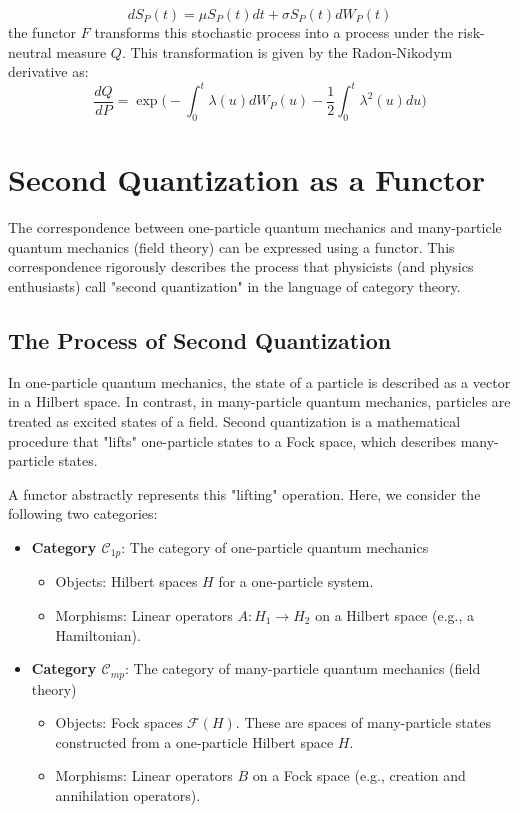 \documentclass[uplatex,a4j,12pt,dvipdfmx]{jsarticle}
\begin{document}
$$
	d S_{P} (t)
	=
	\mu S_{P} (t) dt
	+
	\sigma S_{P} (t) dW_{P}(t)
$$
the functor $F$ transforms this stochastic process into a process under the risk-neutral measure $Q$. This transformation is given by the Radon-Nikodym derivative as:
$$
	\frac{dQ}{dP}
	=
	\exp \Big(
	- \int_{0}^{t} \lambda(u) d W_{P} (u)
	- \frac{1}{2} \int^{t}_{0} \lambda^{2} (u) du
	\Big)
$$




\section{Second Quantization as a Functor}

The correspondence between one-particle quantum mechanics and many-particle quantum mechanics (field theory) can be expressed using a functor. This correspondence rigorously describes the process that physicists (and physics enthusiasts) call "second quantization" in the language of category theory.

\subsection{The Process of Second Quantization}

In one-particle quantum mechanics, the state of a particle is described as a vector in a Hilbert space. In contrast, in many-particle quantum mechanics, particles are treated as excited states of a field. Second quantization is a mathematical procedure that "lifts" one-particle states to a Fock space, which describes many-particle states.

A functor abstractly represents this "lifting" operation. Here, we consider the following two categories:

\begin{itemize}
	\item \textbf{Category $\mathcal{C}_{1p}$}: The category of one-particle quantum mechanics
	      \begin{itemize}
		      \item Objects: Hilbert spaces $H$ for a one-particle system.
		      \item Morphisms: Linear operators $A: H_1 \to H_2$ on a Hilbert space (e.g., a Hamiltonian).
	      \end{itemize}

	\item \textbf{Category $\mathcal{C}_{mp}$}: The category of many-particle quantum mechanics (field theory)
	      \begin{itemize}
		      \item Objects: Fock spaces $\mathcal{F}(H)$. These are spaces of many-particle states constructed from a one-particle Hilbert space $H$.
		      \item Morphisms: Linear operators $B$ on a Fock space (e.g., creation and annihilation operators).
	      \end{itemize}
\end{itemize}
\end{document}
